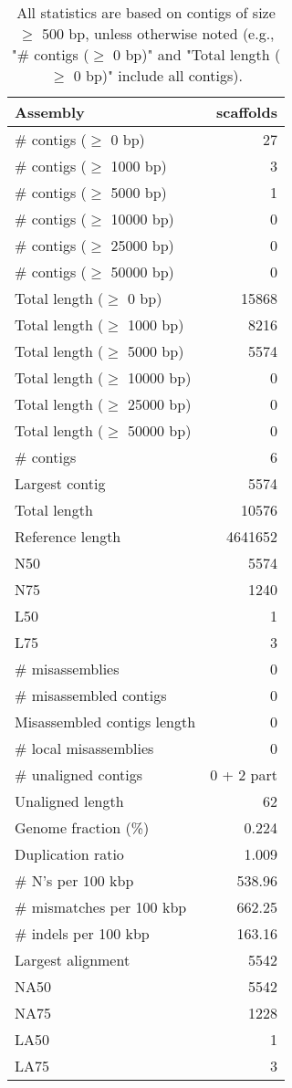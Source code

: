 \documentclass[12pt,a4paper]{article}
\begin{document}
\begin{table}[ht]
\begin{center}
\caption{All statistics are based on contigs of size $\geq$ 500 bp, unless otherwise noted (e.g., "\# contigs ($\geq$ 0 bp)" and "Total length ($\geq$ 0 bp)" include all contigs).}
\begin{tabular}{|l*{1}{|r}|}
\hline
Assembly & scaffolds \\ \hline
\# contigs ($\geq$ 0 bp) & 27 \\ \hline
\# contigs ($\geq$ 1000 bp) & 3 \\ \hline
\# contigs ($\geq$ 5000 bp) & 1 \\ \hline
\# contigs ($\geq$ 10000 bp) & 0 \\ \hline
\# contigs ($\geq$ 25000 bp) & 0 \\ \hline
\# contigs ($\geq$ 50000 bp) & 0 \\ \hline
Total length ($\geq$ 0 bp) & 15868 \\ \hline
Total length ($\geq$ 1000 bp) & 8216 \\ \hline
Total length ($\geq$ 5000 bp) & 5574 \\ \hline
Total length ($\geq$ 10000 bp) & 0 \\ \hline
Total length ($\geq$ 25000 bp) & 0 \\ \hline
Total length ($\geq$ 50000 bp) & 0 \\ \hline
\# contigs & 6 \\ \hline
Largest contig & 5574 \\ \hline
Total length & 10576 \\ \hline
Reference length & 4641652 \\ \hline
N50 & 5574 \\ \hline
N75 & 1240 \\ \hline
L50 & 1 \\ \hline
L75 & 3 \\ \hline
\# misassemblies & 0 \\ \hline
\# misassembled contigs & 0 \\ \hline
Misassembled contigs length & 0 \\ \hline
\# local misassemblies & 0 \\ \hline
\# unaligned contigs & 0 + 2 part \\ \hline
Unaligned length & 62 \\ \hline
Genome fraction (\%) & 0.224 \\ \hline
Duplication ratio & 1.009 \\ \hline
\# N's per 100 kbp & 538.96 \\ \hline
\# mismatches per 100 kbp & 662.25 \\ \hline
\# indels per 100 kbp & 163.16 \\ \hline
Largest alignment & 5542 \\ \hline
NA50 & 5542 \\ \hline
NA75 & 1228 \\ \hline
LA50 & 1 \\ \hline
LA75 & 3 \\ \hline
\end{tabular}
\end{center}
\end{table}
\end{document}
